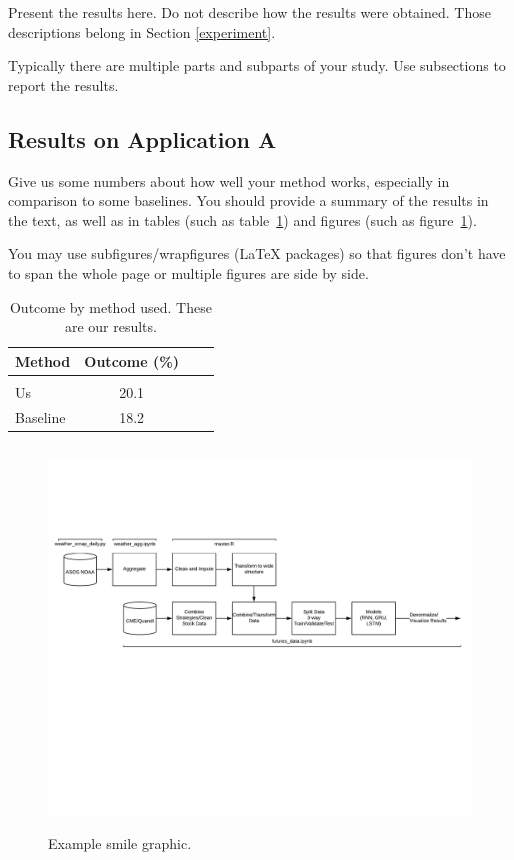 \documentclass[twoside,11pt]{article}
\begin{document}
Present the results here.
Do not describe how the results were obtained.
Those descriptions belong in Section \ref{experiment}.

Typically there are multiple parts and subparts of your study.
Use subsections to report the results.

\subsection{Results on Application A}

Give us some numbers about how well your method works, especially in comparison to some baselines.
You should provide a summary of the results in the text, as well as in tables (such as table~\ref{tab:example}) and figures (such as figure~\ref{fig:example}).

You may use subfigures/wrapfigures (LaTeX packages) so that figures don't have to span the whole page or multiple figures are side by side.

\begin{table}[htbp]
  \centering
  \begin{tabular}{lclc}
    Method & Outcome (\%) \\
    \hline \\[-11pt]
    Us & 20.1 \\
    Baseline & 18.2 \\ \hline
  \end{tabular}
  \label{tab:example}
    \caption{Outcome by method used. These are our results.}
\end{table}

\begin{figure}[htbp]
  \centering
  \includegraphics[height=4in]{DataPipeline.png}
  \caption{Example smile graphic.}
  \label{fig:example}
\end{figure}
\end{document}
